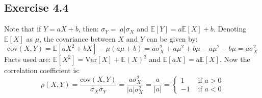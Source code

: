 \documentclass{article}
\begin{document}
\subsection*{Exercise 4.4}
Note that if \(Y = aX + b\), then: \(\sigma_{Y} = |a|\sigma_{X}\) and \(\mathbb{E}[Y] = a\mathbb{E}[X] + b\). Denoting \(\mathbb{E}[X]\) as \(\mu\), the covariance between \(X\) and \(Y\) can be given by:
\begin{equation}
\mathrm{cov}(X, Y) = \mathbb{E}[aX^2 + bX] - \mu(a\mu + b) = a\sigma_{X}^{2} + a\mu^{2} + b\mu - a\mu^{2} - b\mu = a\sigma_{X}^{2}
\end{equation}
Facts used are: \(\mathbb{E}[X^2] = \mathrm{Var}[X] + \mathbb{E}(X)^2\) and \(\mathbb{E}[aX] = a\mathbb{E}[X]\). Now the correlation coefficient is:
\begin{equation}
\rho(X, Y) = \frac{\mathrm{cov}(X, Y)}{\sigma_{X}\sigma_{Y}} = \frac{a\sigma_{X}^{2}}{|a|\sigma_{X}^{2}} = \frac{a}{|a|} =
\begin{cases}
1 & \text{ if } a > 0 \\
-1 & \text{ if } a < 0
\end{cases}
\end{equation}
\end{document}
